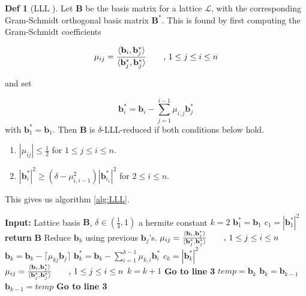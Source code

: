 \documentclass[a4paper, 10pt]{article}
\theoremstyle{definition}
\newtheorem{definition}{Def}[section]
\begin{document}
\begin{definition}[\ac{LLL} \cite{article}]
    Let $\mathbf{B}$ be the basis matrix for a lattice $\mathcal{L}$, with the corresponding Gram-Schmidt orthogonal basis matrix $\mathbf{B}^*$. This is found by first computing the Gram-Schmidt coefficients 
    
    \[\mu _{ij}=\frac{\langle \mathbf{b}_i,\mathbf{b}^*_j\rangle}{\langle\mathbf{b}^*_j,\mathbf{b}^*_j\rangle} \mbox{\qquad , $1 \leq j \leq i \leq n$}\] 
    
    and set
    
    \[\mathbf{b}^*_i=\mathbf{b}_i-\sum_{j=1}^{i-1} \mu _{i,j}\mathbf{b}^*_j\]
    with $\mathbf{b}^*_1=\mathbf{b}_1$. Then $\mathbf{B}$ is $\delta $-LLL-reduced if both conditions below hold.
    \begin{enumerate}
        \item $|\mu_{ij}| \leq \frac{1}{2}$ for $1 \leq j \leq i \leq n$.
        \item $|\mathbf{b}^*_i|^2 \geq (\delta  - \mu ^2_{i,i-1})|\mathbf{b}^*_{i_1}|^2$ for $2 \leq i \leq n$.
    \end{enumerate}
    This gives us algorithm \ref{alg:LLL}.
    \begin{algorithm}[h]
        \caption{\ac{LLL}}\label{alg:LLL}
        \begin{algorithmic}[1]
        \State \textbf{Input:} Lattice basis $\mathbf{B}$, $\delta \in(\frac{1}{4},1)$ a hermite constant
        \State $k=2$
        \State $\mathbf{b}^*_1=\mathbf{b}_1$
        \State $c_1 = |\mathbf{b}^*_1|^2$
            \State \textbf{return} $\mathbf{B}$
        \EndIf
         \Comment Reduce $\mathbf{b}_k$ using previous $\mathbf{b}_j$'s.
            \State  $\mu _{ij}=\frac{\langle \mathbf{b}_i,\mathbf{b}^*_j\rangle}{\langle\mathbf{b}^*_j,\mathbf{b}^*_j\rangle} \mbox{\qquad , $1 \leq j \leq i \leq n$}$
            \State $\mathbf{b}_k = \mathbf{b}_k - \lceil \mu _{kj}\mathbf{b}_j \rceil$
            \State $\mathbf{b}^*_k = \mathbf{b}_k-\sum_{i=1}^{k-1} \mu _{k,i}\mathbf{b}^*_i$
            \State $c_k=|\mathbf{b}_k^*|^2$
            \State  $\mu _{ij}=\frac{\langle \mathbf{b}_i,\mathbf{b}^*_j\rangle}{\langle\mathbf{b}^*_j,\mathbf{b}^*_j\rangle} \mbox{\qquad , $1 \leq j \leq i \leq n$}$
        \EndFor
            \State $k=k+1$
            \State \textbf{Go to line 3}
        \Else
            \State $temp = \mathbf{b}_k$
            \State $\mathbf{b}_k = \mathbf{b}_{k-1}$
            \State $\mathbf{b}_{k-1} = temp$
            \State \textbf{Go to line 3}
        \EndIf
        \end{algorithmic}
    \end{algorithm}
\end{definition}
\end{document}
